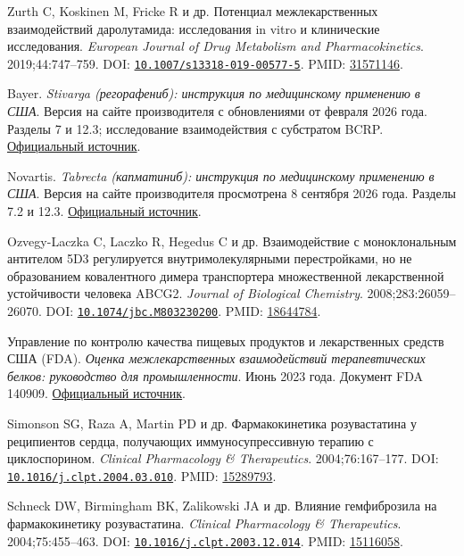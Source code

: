 \documentclass[11pt]{article}
\begin{document}
\begin{description}[before={\microtypesetup{expansion=false}\setlength{\RaggedRightRightskip}{0pt plus 4em}\RaggedRight}]
\item[{[20]}] Zurth C, Koskinen M, Fricke R и др. Потенциал межлекарственных взаимодействий даролутамида: исследования in vitro и клинические исследования. \textit{\foreignlanguage{english}{European Journal of Drug Metabolism and Pharmacokinetics}}. 2019;44:747--759. DOI: \href{https://doi.org/10.1007/s13318-019-00577-5}{\nolinkurl{10.1007/s13318-019-00577-5}}. PMID: \href{https://pubmed.ncbi.nlm.nih.gov/31571146/}{31571146}.
\item[{[21]}] Bayer. \textit{Stivarga (регорафениб): инструкция по медицинскому применению в США}. Версия на сайте производителя с обновлениями от февраля 2026 года. Разделы 7 и 12.3; исследование взаимодействия с субстратом BCRP. \href{https://dailymed.nlm.nih.gov/dailymed/drugInfo.cfm?setid=824f19c9-0546-4a8a-8d8f-c4055c04f7c7}{Официальный источник}.
\item[{[22]}] Novartis. \textit{Tabrecta (капматиниб): инструкция по медицинскому применению в США}. Версия на сайте производителя просмотрена 8 сентября 2026 года. Разделы 7.2 и 12.3. \href{https://www.novartis.com/us-en/sites/novartis_us/files/tabrecta.pdf}{Официальный источник}.
\item[{[23]}] Ozvegy-Laczka C, Laczko R, Hegedus C и др. Взаимодействие с моноклональным антителом 5D3 регулируется внутримолекулярными перестройками, но не образованием ковалентного димера транспортера множественной лекарственной устойчивости человека ABCG2. \textit{\foreignlanguage{english}{Journal of Biological Chemistry}}. 2008;283:26059--26070. DOI: \href{https://doi.org/10.1074/jbc.M803230200}{\nolinkurl{10.1074/jbc.M803230200}}. PMID: \href{https://pubmed.ncbi.nlm.nih.gov/18644784/}{18644784}.
\item[{[24]}] Управление по контролю качества пищевых продуктов и лекарственных средств США (FDA). \textit{Оценка межлекарственных взаимодействий терапевтических белков: руководство для промышленности}. Июнь 2023 года. Документ FDA 140909. \href{https://www.fda.gov/media/140909/download}{Официальный источник}.
\item[{[25]}] Simonson SG, Raza A, Martin PD и др. Фармакокинетика розувастатина у реципиентов сердца, получающих иммуносупрессивную терапию с циклоспорином. \textit{\foreignlanguage{english}{Clinical Pharmacology \& Therapeutics}}. 2004;76:167--177. DOI: \href{https://doi.org/10.1016/j.clpt.2004.03.010}{\nolinkurl{10.1016/j.clpt.2004.03.010}}. PMID: \href{https://pubmed.ncbi.nlm.nih.gov/15289793/}{15289793}.
\item[{[26]}] Schneck DW, Birmingham BK, Zalikowski JA и др. Влияние гемфиброзила на фармакокинетику розувастатина. \textit{\foreignlanguage{english}{Clinical Pharmacology \& Therapeutics}}. 2004;75:455--463. DOI: \href{https://doi.org/10.1016/j.clpt.2003.12.014}{\nolinkurl{10.1016/j.clpt.2003.12.014}}. PMID: \href{https://pubmed.ncbi.nlm.nih.gov/15116058/}{15116058}.

\end{description}
\end{document}
